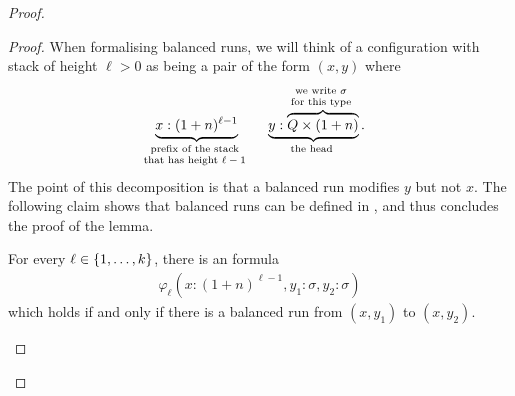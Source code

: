 \begin{proof}
\begin{proof}
    When formalising balanced runs, we will think of a configuration with stack of  height $\ell > 0$ as being a pair of the form $(x,y)$ where
        \begin{align*}
        \myunderbrace{x: (1+n)^{\ell-1}}{prefix of the  stack \\  that  has height $\ell-1$} \quad  \quad \myunderbrace{y: \myoverbrace{Q \times (1+n)}{we write $\sigma$ \\ for this type}}{the head}.
        \end{align*}
    The point of this decomposition is that a balanced run modifies $y$ but not $x$.  The following claim shows that balanced runs can be defined in \mso, and thus concludes the proof of the lemma.
        \begin{claim}\label{claim:reachability-basic-run}
            For every $\ell \in \{1,\ldots,k\}$, there is an \mso formula
                \begin{align*}
    \varphi_\ell(x : (1+n)^{\ell-1}, y_1  : \sigma, y_2 : \sigma)
    \end{align*}
    which holds if and only if there is a balanced run from  $(x,y_1)$ to  $(x,y_2)$.
        \end{claim}


\end{proof}
\end{proof}

